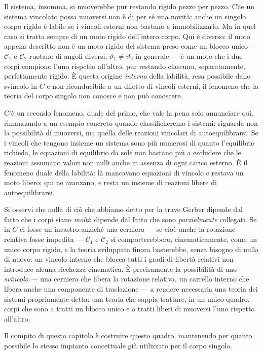 Il sistema, insomma, si
muoverebbe pur restando rigido pezzo per pezzo. Che un sistema vincolato
possa muoversi non è di per sé una novità: anche un singolo corpo rigido
è labile se i vincoli esterni non bastano a immobilizzarlo. Ma in quel caso si tratta sempre di un moto
rigido dell'intero corpo. Qui è diverso: il moto appena descritto non è un moto rigido del sistema
preso come un blocco unico --- $\mathcal{C}_1$ e $\mathcal{C}_2$ ruotano
di angoli diversi, $\vartheta_1\neq\vartheta_2$ in generale --- è un moto
che i due corpi compiono l'uno rispetto all'altro, pur restando ciascuno,
separatamente, perfettamente rigido. È questa origine \emph{interna}
della labilità, resa possibile dallo svincolo in $C$ e non riconducibile
a un difetto di vincoli esterni, il fenomeno che la teoria del corpo
singolo non conosce e non può conoscere.

C'è un secondo fenomeno, duale del primo, che vale la pena solo annunciare
qui, rimandando a un esempio concreto quando classificheremo i sistemi: riguarda non la possibilità
di muoversi, ma quella delle reazioni vincolari di autoequilibrarsi. Se i
vincoli che tengono insieme un sistema sono più numerosi di quanto
l'equilibrio richieda, le equazioni di equilibrio da sole non bastano più
a escludere che le reazioni assumano valori non nulli anche in assenza di
ogni carico esterno. È il fenomeno duale della labilità: là mancavano
equazioni di vincolo e restava un moto libero; qui ne avanzano, e resta
un insieme di reazioni libere di autoequilibrarsi.

Si osservi che nulla di ciò  che abbiamo detto per la trave Gerber dipende dal fatto che i corpi siano
\emph{molti}: dipende dal fatto che sono \emph{parzialmente} collegati.
Se in $C$ ci fosse un incastro anziché una cerniera --- se cioè anche la
rotazione relativa fosse impedita --- $\mathcal{C}_1$ e $\mathcal{C}_2$
si comporterebbero, cinematicamente, come un unico corpo rigido, e la
teoria sviluppata finora basterebbe, senza bisogno di nulla di
nuovo: un vincolo interno che blocca tutti i gradi di libertà relativi
non introduce alcuna ricchezza cinematica. È precisamente la possibilità
di uno \emph{svincolo} --- una cerniera che libera la rotazione relativa,
un carrello interno che libera anche una componente di traslazione ---
a rendere necessaria una teoria dei sistemi propriamente detta: una
teoria che sappia trattare, in un unico quadro, corpi che sono a tratti
un blocco unico e a tratti liberi di muoversi l'uno rispetto all'altro.

Il compito di questo capitolo è costruire questo quadro, mantenendo per
quanto possibile lo stesso impianto concettuale già utilizzato per il
corpo singolo.


